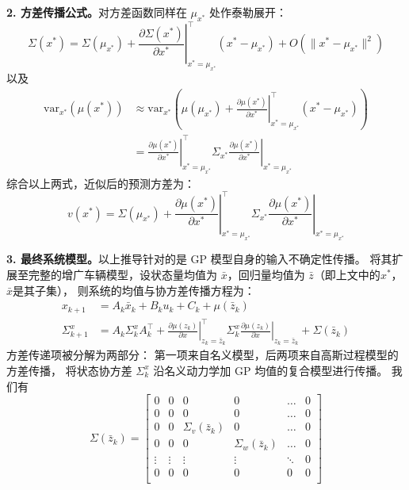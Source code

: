 \textbf{2. 方差传播公式。}对方差函数同样在 $\mu_{x^*}$ 处作泰勒展开：
\begin{equation}
    \Sigma(x^{*}) = \Sigma(\mu_{x^{*}}) 
    + \left.\frac{\partial\Sigma(x^{*})}{\partial x^{*}}\right|_{x^{*}=\mu_{x^{*}}}^{\!\top}
    (x^{*} - \mu_{x^{*}}) + O\!\left(\|x^{*} - \mu_{x^{*}}\|^{2}\right)
\end{equation}
以及
\begin{equation}
    \begin{aligned}
        \mathrm{var}_{x^{*}}\!\left(\mu(x^{*})\right) 
    &\approx \mathrm{var}_{x^{*}}\!\left(\mu(\mu_{x^{*}}) 
    + \left.\frac{\partial\mu(x^{*})}{\partial x^{*}}\right|_{x^{*}=\mu_{x^{*}}}^{\!\top}
    (x^{*}-\mu_{x^{*}})\right) \\
    &= \left.\frac{\partial\mu(x^{*})}{\partial x^{*}}\right|_{x^{*}=\mu_{x^{*}}}^{\!\top}
    \Sigma_{x^{*}}
    \left.\frac{\partial\mu(x^{*})}{\partial x^{*}}\right|_{x^{*}=\mu_{x^{*}}}
    \end{aligned}
\end{equation}
综合以上两式，近似后的预测方差为：
\begin{equation} \label{equ:var_transfer_gp}
    v(x^{*}) = \Sigma(\mu_{x^{*}}) 
    + \left.\frac{\partial\mu(x^{*})}{\partial x^{*}}\right|_{x^{*}=\mu_{x^{*}}}^{\!\top}
    \Sigma_{x^{*}}
    \left.\frac{\partial\mu(x^{*})}{\partial x^{*}}\right|_{x^{*}=\mu_{x^{*}}}
\end{equation}

\textbf{3. 最终系统模型。}以上推导针对的是 GP 模型自身的输入不确定性传播。
将其扩展至完整的增广车辆模型，设状态量均值为 $\bar{x}$，回归量均值为 $\bar{z}$（即上文中的$x^*$，$\bar x$是其子集），
则系统的均值与协方差传播方程为：
\begin{equation} \label{equ:transfer_model}
    \begin{aligned}
        x_{k+1} &= A_k \bar{x}_k + B_k u_k + C_k + \mu(\bar{z}_k) \\
        \Sigma_{k+1}^x &= A_k \Sigma_{k}^x A_k^\top + \left.\frac{\partial \mu(z_k)}{\partial x}\right|_{z_k = \bar{z}_k}^\top
         \Sigma_{k}^x \left.\frac{\partial \mu(z_k)}{\partial x}\right|_{z_k = \bar{z}_k} + \Sigma(\bar{z}_k)
    \end{aligned}
\end{equation}
方差传递项被分解为两部分：
第一项来自名义模型，后两项来自高斯过程模型的方差传播，
将状态协方差 $\Sigma_k^x$ 沿名义动力学加 GP 均值的复合模型进行传播。
我们有
\begin{equation}
    \Sigma(\bar{z}_k) = \begin{bmatrix}
        0 & 0 & 0 & 0 & \ldots & 0 \\
        0 & 0 & 0 & 0 & \ldots & 0 \\
        0 & 0 & \Sigma_v(\bar{z}_k) & 0 & \ldots & 0 \\
        0 & 0 & 0 & \Sigma_w(\bar{z}_k) & \ldots & 0 \\
        \vdots & \vdots & \vdots & \vdots & \ddots & 0 \\
        0 & 0 & 0 & 0 & 0 & 0 \\
    \end{bmatrix}
\end{equation}


